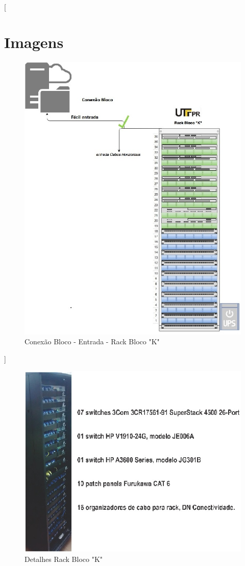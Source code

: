 \documentclass[	DIV=calc,%
paper=a4,%
fontsize=12pt,%
onecolumn]{scrartcl}	 					%
\begin{document}
	[\section{Imagens}
	\begin{figure}[!h]
		\centering
		\caption{Conexão Bloco - Entrada - Rack Bloco "K"}
		\includegraphics{entrada_1}
	\end{figure}]
	\begin{figure}[!h]
		\centering
		\caption{Detalhes Rack Bloco "K"}
		\includegraphics{rack_1}
	\end{figure}
\end{document}
